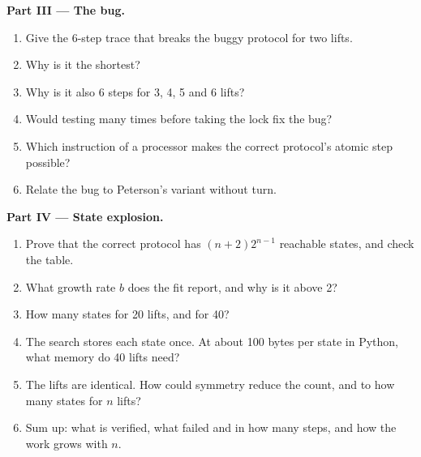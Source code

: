 \begin{problem}
\medskip\noindent\textbf{Part III --- The bug.}
\begin{enumerate}[resume]
  \item Give the 6-step trace that breaks the buggy protocol for two lifts.
  \item Why is it the shortest?
  \item Why is it also 6 steps for 3, 4, 5 and 6 lifts?
  \item Would testing many times before taking the lock fix the bug?
  \item Which instruction of a processor makes the correct protocol's atomic step possible?
  \item Relate the bug to Peterson's variant without turn.
\end{enumerate}

\medskip\noindent\textbf{Part IV --- State explosion.}
\begin{enumerate}[resume]
  \item Prove that the correct protocol has $(n + 2) 2^{n - 1}$ reachable states, and check the table.
  \item What growth rate $b$ does the fit report, and why is it above 2?
  \item How many states for 20 lifts, and for 40?
  \item The search stores each state once. At about 100 bytes per state in Python, what memory do 40 lifts need?
  \item The lifts are identical. How could symmetry reduce the count, and to how many states for $n$ lifts?
  \item Sum up: what is verified, what failed and in how many steps, and how the work grows with $n$.
\end{enumerate}
\end{problem}
